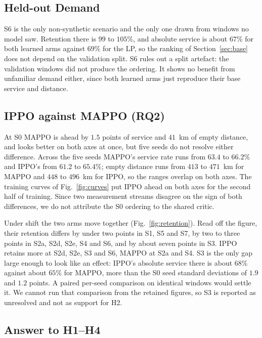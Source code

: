 \documentclass[conference]{IEEEtran}
\begin{document}
\subsection{Held-out Demand}
\label{sec:heldout}

S6 is the only non-synthetic scenario and the only one drawn from windows no
model saw. Retention there is $99$ to $105\%$, and absolute service is about
$67\%$ for both learned arms against $69\%$ for the LP, so the ranking of
Section~\ref{sec:base} does not depend on the validation split. S6 rules out a
split artefact: the validation windows did not produce the ordering. It shows
no benefit from unfamiliar demand either, since both learned arms just
reproduce their base service and distance.

\subsection{IPPO against MAPPO (RQ2)}
\label{sec:ippo}

At S0 MAPPO is ahead by $1.5$ points of service and $41$~km of empty distance,
and looks better on both axes at once, but five seeds do not resolve either
difference. Across the five seeds MAPPO's service rate runs from $63.4$ to
$66.2\%$ and IPPO's from $61.2$ to $65.4\%$; empty distance runs from $413$ to
$471$~km for MAPPO and $448$ to $496$~km for IPPO, so the ranges overlap on
both axes. The training curves of Fig.~\ref{fig:curves} put IPPO ahead on both
axes for the second half of training. Since two measurement streams disagree
on the sign of both differences, we do not attribute the S0 ordering to the
shared critic.

Under shift the two arms move together (Fig.~\ref{fig:retention}). Read off
the figure, their retention differs by under two points in S1, S5 and S7, by
two to three points in S2a, S2d, S2e, S4 and S6, and by about seven points in
S3. IPPO retains more at S2d, S2e, S3 and S6, MAPPO at S2a and S4. S3 is the
only gap large enough to look like an effect: IPPO's absolute service there is
about $68\%$ against about $65\%$ for MAPPO, more than the S0 seed standard
deviations of $1.9$ and $1.2$ points. A paired per-seed comparison on identical
windows would settle it. We cannot run that comparison from the retained
figures, so S3 is reported as unresolved and not as support for H2.

\subsection{Answer to H1--H4}
\label{sec:hypotheses}
\end{document}
